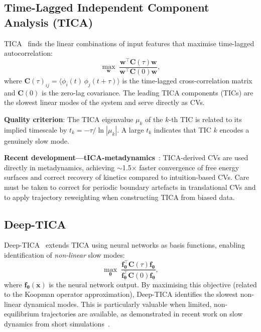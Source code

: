 \documentclass[12pt, a4paper]{article}
\begin{document}
\subsection{Time-Lagged Independent Component Analysis (TICA)}
\label{sec:tica}

TICA~\citep{Molgedey1994,Perez2013TICA} finds the linear combinations of 
input features that maximise time-lagged autocorrelation:
\begin{equation}
  \max_{\mathbf{w}} \; \frac{\mathbf{w}^\top \mathbf{C}(\tau) \mathbf{w}}
                             {\mathbf{w}^\top \mathbf{C}(0) \mathbf{w}},
\end{equation}
where $\mathbf{C}(\tau)_{ij} = \langle \phi_i(t)\,\phi_j(t+\tau)\rangle$ 
is the time-lagged cross-correlation matrix and $\mathbf{C}(0)$ is the 
zero-lag covariance.  The leading TICA components (TICs) are the slowest 
linear modes of the system and serve directly as CVs.

\textbf{Quality criterion}: The TICA eigenvalue $\mu_k$ of the $k$-th 
TIC is related to its implied timescale by 
$t_k = -\tau/\ln|\mu_k|$.  A large $t_k$ indicates that TIC $k$ 
encodes a genuinely slow mode.

\textbf{Recent development---tICA-metadynamics}~\citep{Smith2024tICAMeta}: 
TICA-derived CVs are used directly in metadynamics, achieving $\sim$1.5$\times$ 
faster convergence of free energy surfaces and correct recovery of 
kinetics compared to intuition-based CVs.  Care must be taken to 
correct for periodic boundary artefacts in translational CVs and to 
apply trajectory reweighting when constructing TICA from biased data.

\subsection{Deep-TICA}

Deep-TICA~\citep{DeepTICA2021} extends TICA using neural networks as 
basis functions, enabling identification of \emph{non-linear} slow 
modes:
\begin{equation}
  \max_{\boldsymbol{\theta}} \; 
  \frac{\mathbf{f}_{\boldsymbol\theta}^\top \mathbf{C}(\tau) 
        \mathbf{f}_{\boldsymbol\theta}}
       {\mathbf{f}_{\boldsymbol\theta}^\top \mathbf{C}(0) 
        \mathbf{f}_{\boldsymbol\theta}},
\end{equation}
where $\mathbf{f}_{\boldsymbol\theta}(\mathbf{x})$ is the neural network 
output.  By maximising this objective (related to the Koopman operator 
approximation), Deep-TICA identifies the slowest non-linear dynamical 
modes.  This is particularly valuable when limited, non-equilibrium 
trajectories are available, as demonstrated in recent work on slow 
dynamics from short simulations~\citep{SlowModes2025}.
\end{document}
